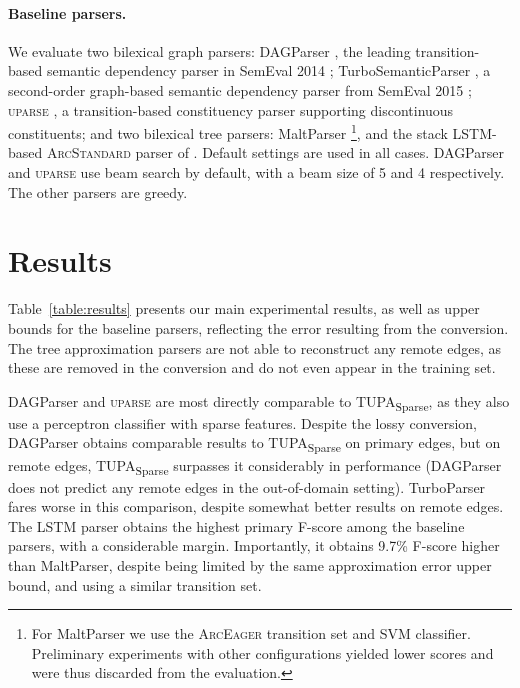 \documentclass[11pt,a4paper]{article}
\newcommand{\parser}[1]{TUPA\textsubscript{#1}}
\newcommand{\tabref}[1]{Table~\ref{#1}}
\begin{document}
\paragraph{Baseline parsers.}
We evaluate two bilexical graph parsers:
DAGParser \cite{ribeyre-villemontedelaclergerie-seddah:2014:SemEval}, the leading 
transition-based semantic dependency parser in SemEval 2014 \cite{oepen2014semeval};
TurboSemanticParser \cite{almeida-martins:2015:SemEval},
a second-order graph-based semantic dependency parser from SemEval 2015 
\cite{oepen2015semeval};
\textsc{uparse} \cite{maier-lichte:2016:DiscoNLP},
a transition-based constituency parser supporting discontinuous constituents;
and two bilexical tree parsers:
MaltParser \cite{nivre2007maltparser}\footnote{For
MaltParser we use the \textsc{ArcEager} transition set and SVM classifier.
Preliminary experiments with other configurations yielded lower scores and
were thus discarded from the evaluation.},
and the stack LSTM-based \textsc{ArcStandard} parser of \citet{dyer2015transition}.
Default settings are used in all cases.
DAGParser and \textsc{uparse} use beam search by default, with a beam size of 5 and 4
respectively. The other parsers are greedy.



\section{Results}\label{sec:results}

\tabref{table:results} presents our main experimental results, as well as
upper bounds for the baseline parsers,
reflecting the error resulting from the conversion.
The tree approximation parsers are not able to reconstruct any remote edges,
as these are removed in the conversion and do not even appear in the training set.

DAGParser and \textsc{uparse} are most directly comparable to
\parser{Sparse}, as they also use a perceptron classifier with sparse features.
Despite the lossy conversion, DAGParser obtains comparable results to
\parser{Sparse} on primary edges, but on remote edges, \parser{Sparse}
surpasses it considerably in performance
(DAGParser does not predict any remote edges in the out-of-domain setting).
TurboParser fares worse in this comparison, despite somewhat better results on
remote edges.
The LSTM parser obtains the highest primary F-score among the baseline parsers,
with a considerable margin. Importantly, it obtains 9.7\% F-score
higher than MaltParser,
despite being limited by the same approximation error upper bound,
and using a similar transition set.
\end{document}
